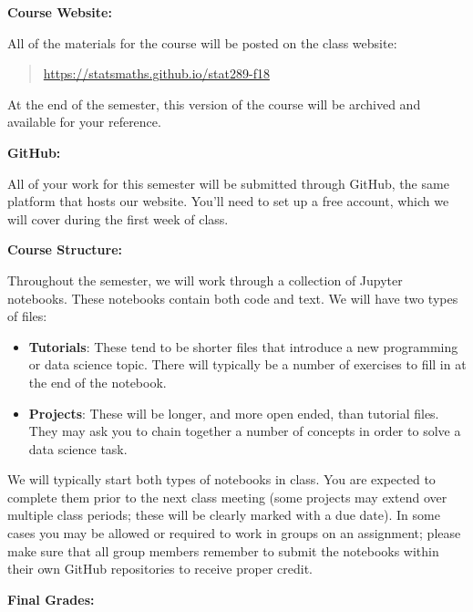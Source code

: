 \documentclass[12pt]{article}
\begin{document}
\bigskip

\textbf{Course Website:} \vspace{6pt}

All of the materials for the course will be posted on the class website:
\begin{quote}
\url{https://statsmaths.github.io/stat289-f18}
\end{quote}
At the end of the semester, this version of the course will be archived and
available for your reference.

\bigskip

\textbf{GitHub:} \vspace{6pt}

All of your work for this semester will be submitted through GitHub,
the same platform that hosts our website. You'll need to set up a free
account, which we will cover during the first week of class.

\bigskip

\textbf{Course Structure:} \vspace{6pt}

Throughout the semester, we will work through a collection of Jupyter
notebooks. These notebooks contain both code and text. We will have two types
of files:
\begin{itemize}\setlength\itemsep{0em}
\item \textbf{Tutorials}: These tend to be shorter files that introduce a new
programming or data science topic. There will typically be a number of
exercises to fill in at the end of the notebook.
\item \textbf{Projects}: These will be longer, and more open ended, than
tutorial files. They may ask you to chain together a number of concepts in
order to solve a data science task.
\end{itemize}
We will typically start both types of notebooks in class. You are expected to
complete them prior to the next class meeting (some projects may extend over
multiple class periods; these will be clearly marked with a due date). In some
cases you may be allowed or required to work in groups on an assignment; please
make sure that all group members remember to submit the notebooks within their
own GitHub repositories to receive proper credit.

\bigskip

\textbf{Final Grades:} \vspace{6pt}
\end{document}
